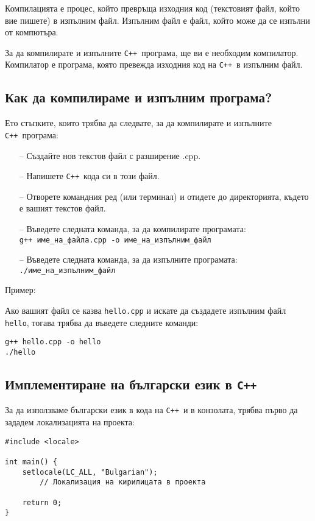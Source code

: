 \documentclass[oneside]{book}
\newcommand*{\code}[1]{\texttt{#1}}
\newcommand*{\cpp}{\texttt{C++}\ }
\begin{document}
Компилацията е процес, който превръща изходния код (текстовият файл, който вие пишете) в изпълним файл.
Изпълним файл е файл, който може да се изпълни от компютъра.

За да компилирате и изпълните \cpp програма, ще ви е необходим компилатор.
Компилатор е програма, която превежда изходния код на \cpp в изпълним файл.

\subsection{Как да компилираме и изпълним програма?}
Ето стъпките, които трябва да следвате, за да компилирате и изпълните \cpp програма:

\begin{enumerate}
    \item[--] Създайте нов текстов файл с разширение .cpp.
    \item[--] Напишете \cpp кода си в този файл.
    \item[--] Отворете командния ред (или терминал) и отидете до директорията, където е вашият текстов файл.
    \item[--] Въведете следната команда, за да компилирате програмата:\\
        \code{g++ име\_на\_файла.cpp -o име\_на\_изпълним\_файл}
    \item[--] Въведете следната команда, за да изпълните програмата:\\
        \code{./име\_на\_изпълним\_файл}
\end{enumerate}

Пример:

Ако вашият файл се казва \code{hello.cpp} и искате да създадете изпълним файл \code{hello}, тогава трябва да въведете следните команди:

\begin{mdframed}\begin{lstlisting}[language={}]
g++ hello.cpp -o hello
./hello
\end{lstlisting}\end{mdframed}

\subsection{Имплементиране на български език в \cpp}
За да използваме български език в кода на \cpp и в конзолата, трябва първо да
зададем локализацията на проекта:
\begin{mdframed}\begin{lstlisting}
#include <locale>

int main() {
    setlocale(LC_ALL, "Bulgarian");
        // Локализация на кирилицата в проекта

    return 0;
}
\end{lstlisting}\end{mdframed}
\end{document}
